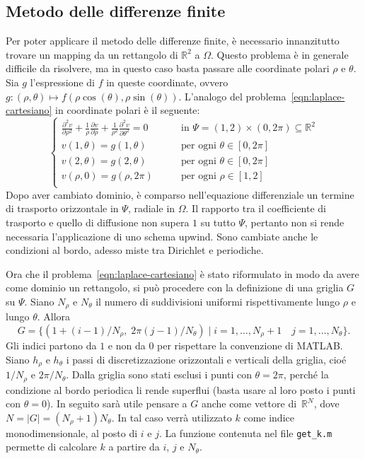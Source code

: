 \documentclass[a4paper]{article}
\newcommand{\R}{\mathbb{R}}
\begin{document}
\subsection{Metodo delle differenze finite}
Per poter applicare il metodo delle differenze finite,
è necessario innanzitutto trovare un mapping da un rettangolo
di $\R^2$ a $\Omega$.
Questo problema è in generale difficile da risolvere,
ma in questo caso basta passare alle coordinate polari $\rho$ e $\theta$.
Sia $g$ l'espressione di $f$ in queste coordinate, ovvero
$g \colon (\rho, \theta) \mapsto f(\rho\cos(\theta), \rho\sin(\theta))$.
L'analogo del problema~\eqref{eqn:laplace-cartesiano} in
coordinate polari è il seguente:
\begin{equation} \label{eqn:laplace-polare}
\begin{cases}
\frac{\partial^2 v}{\partial\rho^2}
	+ \frac{1}{\rho} \frac{\partial v}{\partial\rho}
	+ \frac{1}{\rho^2} \frac{\partial^2 v}{\partial\theta^2} = 0
	\qquad & \text{in $\Psi = (1,2)\times(0,2\pi) \subseteq \mathbb{R}^2$} \\
v(1,\theta) = g(1,\theta)
	\qquad & \text{per ogni $\theta \in [0,2\pi]$} \\
v(2,\theta) = g(2,\theta)
	\qquad & \text{per ogni $\theta \in [0,2\pi]$} \\
v(\rho,0) = g(\rho,2\pi)
	\qquad & \text{per ogni $\rho \in [1,2]$} \\
\end{cases}
\end{equation}
Dopo aver cambiato dominio, è comparso nell'equazione differenziale
un termine di trasporto orizzontale in $\Psi$, radiale in $\Omega$.
Il rapporto tra il coefficiente di trasporto e quello di diffusione
non supera $1$ su tutto $\Psi$, pertanto non si rende
necessaria l'applicazione di uno schema upwind.
Sono cambiate anche le condizioni al bordo,
adesso miste tra Dirichlet e periodiche.

Ora che il problema~\eqref{eqn:laplace-cartesiano} è stato riformulato
in modo da avere come dominio un rettangolo, si può procedere
con la definizione di una griglia $G$ su $\Psi$.
Siano $N_\rho$ e $N_\theta$ il numero di suddivisioni uniformi
rispettivamente lungo $\rho$ e lungo $\theta$. Allora
\[
G = \{ (1+(i-1)/N_\rho, \; 2\pi (j-1)/N_\theta)
\mid i = 1,\dots,N_\rho+1 \quad j = 1,\dots,N_\theta \}.
\]
Gli indici partono da $1$ e non da $0$ per rispettare la convenzione di MATLAB.
Siano $h_\rho$ e $h_\theta$ i passi di discretizzazione orizzontali
e verticali della griglia, cioé $1/N_\rho$ e $2\pi/N_\theta$.
Dalla griglia sono stati esclusi i punti con $\theta = 2\pi$, perché la
condizione al bordo periodica li rende superflui (basta usare al loro posto
i punti con $\theta = 0$).
In seguito sarà utile pensare a $G$ anche come vettore di~$\R^N$,
dove $N = |G| = (N_\rho+1)N_\theta$. In tal caso verrà utilizzato $k$
come indice monodimensionale, al posto di $i$ e $j$.
La funzione contenuta nel file \texttt{get\_k.m} permette di calcolare $k$ a partire
da $i$, $j$ e $N_\theta$.
\end{document}
